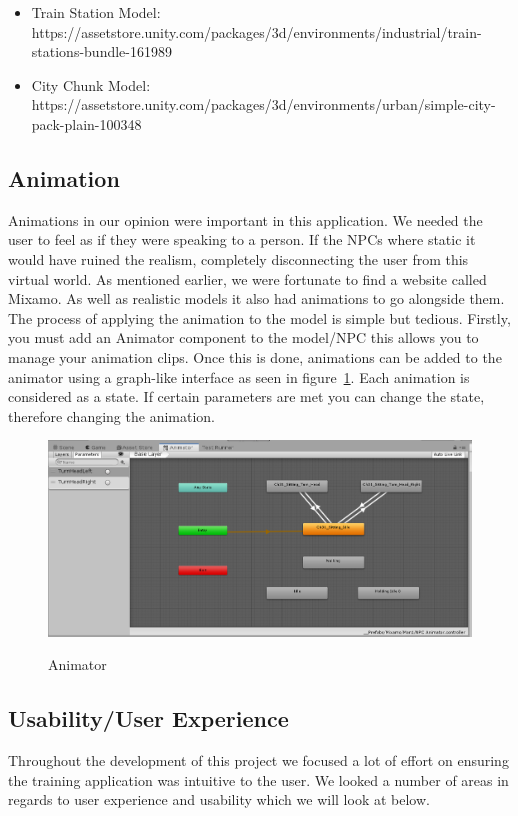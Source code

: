 \begin{itemize}
    \item Train Station Model: https://assetstore.unity.com/packages/3d/environments/industrial/train-stations-bundle-161989
    \item City Chunk Model: https://assetstore.unity.com/packages/3d/environments/urban/simple-city-pack-plain-100348
\end{itemize}

\subsection{Animation}
Animations in our opinion were important in this application. We needed the user to feel as if they were speaking to a person. If the NPCs where static it would have ruined the realism, completely disconnecting the user from this virtual world. As mentioned earlier, we were fortunate to find a website called Mixamo\cite{Mixamo31:online}. As well as realistic models it also had animations to go alongside them. The process of applying the animation to the model is simple but tedious. Firstly, you must add an Animator component to the model/NPC this allows you to manage your animation clips. Once this is done, animations can be added to the animator using a graph-like interface as seen in figure~\ref{fig:anim}. Each animation is considered as a state. If certain parameters are met you can change the state, therefore changing the animation.

\begin{figure}[!ht]
    \centering
    \caption{Animator}
    \includegraphics[width=1\textwidth]{Images/animator.PNG}
    \label{fig:anim}
\end{figure}

\newpage
\subsection{Usability/User Experience}
Throughout the development of this project we focused a lot of effort on ensuring the training application was intuitive to the user. We looked a number of areas in regards to user experience and usability which we will look at below.


